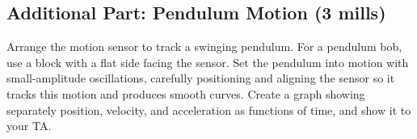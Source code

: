 \documentclass{article}
\begin{document}
\subsection*{Additional Part: Pendulum Motion (3 mills)}
Arrange the motion sensor to track a swinging pendulum. For a pendulum bob, use a block with a flat side facing the sensor. Set the pendulum into motion with small-amplitude oscillations, carefully positioning and aligning the sensor so it tracks this motion and produces smooth curves. Create a graph showing separately position, velocity, and acceleration as functions of time, and show it to your TA.
\end{document}
